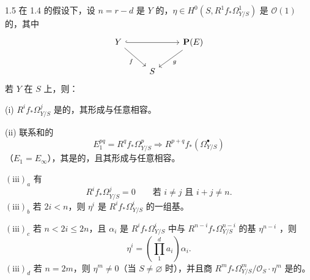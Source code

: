 \begin{SGAresult}{}{1.5}
在 1.4 的假设下，设 $n=r-d$ 是 $Y$ 的，$\eta\in H^0(S,R^1f_*\Omega^1_{Y/S})$ 是 $\mathcal O(1)$ 的，其中
\[
\begin{tikzcd}
Y\arrow[rr,hook]\arrow[dr,"f"']&&\mathbf P(E)\arrow[dl,"g"]\\
&S&
\end{tikzcd}
\]
若 $Y$ 在 $S$ 上，则：

(i) $R^if_*\Omega^j_{Y/S}$ 是的，其形成与任意相容。

(ii) 联系和的
\[
 E_1^{pq}=R^qf_*\Omega^p_{Y/S}\Longrightarrow R^{p+q}f_*(\Omega^\bullet_{Y/S})
\]
（$E_1=E_\infty$），其是的，且其形成与任意相容。

$(\mathrm{iii})_a$ 有
\[
 R^if_*\Omega^j_{Y/S}=0\qquad\text{若 }i\ne j\text{ 且 }i+j\ne n.
\]
$(\mathrm{iii})_b$ 若 $2i<n$，则 $\eta^i$ 是 $R^if_*\Omega^i_{Y/S}$ 的一组基。

$(\mathrm{iii})_c$ 若 $n<2i\leq2n$，且 $\alpha_i$ 是 $R^if_*\Omega^i_{Y/S}$ 中与 $R^{n-i}f_*\Omega^{n-i}_{Y/S}$ 的基 $\eta^{n-i}$ ，则
\[
 \eta^i=\left(\prod_{1}^{d}a_i\right)\alpha_i.
\]
$(\mathrm{iii})_d$ 若 $n=2m$，则 $\eta^m\ne0$（当 $S\ne\varnothing$ 时），并且商 $R^mf_*\Omega^m_{Y/S}/\mathcal O_S\cdot\eta^m$ 是的。
\end{SGAresult}
